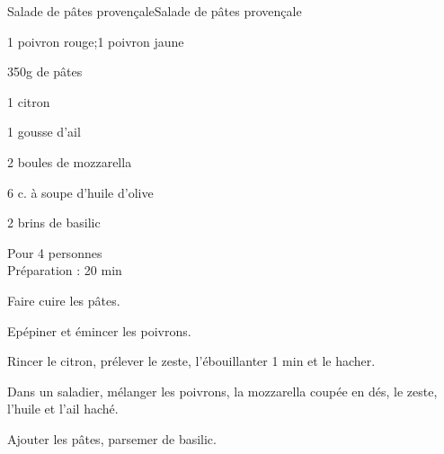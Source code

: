 \begin{recette}{Salade de pâtes provençale}{Salade de pâtes provençale}

\begin{ingredients}
1 poivron rouge;1 poivron jaune\par
350g de pâtes\par
1 citron\par
1 gousse d'ail\par
2 boules de mozzarella\par
6 c. à soupe d'huile d'olive\par
2 brins de basilic\par
\end{ingredients}

\begin{infos}
Pour 4 personnes\\
Préparation : 20 min\\
\end{infos}

\begin{etapes}
\item Faire cuire les pâtes.
\item Epépiner et émincer les poivrons.
\item Rincer le citron, prélever le zeste, l'ébouillanter 1 min et le hacher.
\item Dans un saladier, mélanger les poivrons, la mozzarella coupée en dés, le zeste, l'huile et l'ail haché.
\item Ajouter les pâtes, parsemer de basilic.
\end{etapes}

\end{recette}